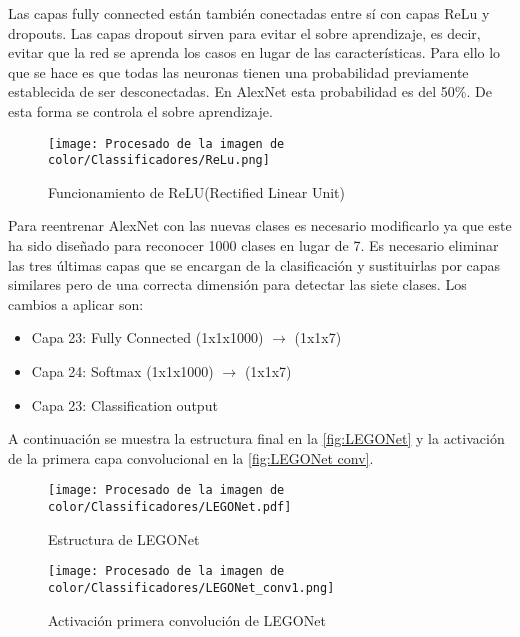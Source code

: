 Las capas fully connected están también conectadas entre sí con capas ReLu y dropouts. Las capas dropout sirven para evitar el sobre aprendizaje, es decir, evitar que la red se aprenda los casos en lugar de las características. Para ello lo que se hace es que todas las neuronas tienen una probabilidad previamente establecida de ser desconectadas. En AlexNet esta probabilidad es del 50\%. De esta forma se controla el sobre aprendizaje.


\begin{figure}[ht]  %
	\centering
	\texttt{[image: Procesado de la imagen de color/Classificadores/ReLu.png]}
	\caption{Funcionamiento de ReLU(Rectified Linear Unit)}
	\label{fig:ReLu}
	\vspace{-5pt}
\end{figure}


Para reentrenar AlexNet con las nuevas clases es necesario modificarlo ya que este ha sido diseñado para reconocer 1000 clases en lugar de 7. Es necesario eliminar las tres últimas capas que se encargan de la clasificación y sustituirlas por capas similares pero de una correcta dimensión para detectar las siete clases. Los cambios a aplicar son:
\begin{itemize}
\item Capa 23: Fully Connected (1x1x1000) $\rightarrow$ (1x1x7)
\item Capa 24: Softmax (1x1x1000) $\rightarrow$ (1x1x7)
\item Capa 23: Classification output
\end{itemize}

A continuación se muestra la estructura final en la \autoref{fig:LEGONet} y la activación de la primera capa convolucional en la \autoref{fig:LEGONet conv}.
	
\begin{figure}[ht]  %
	\centering
	\texttt{[image: Procesado de la imagen de color/Classificadores/LEGONet.pdf]}
	\caption{Estructura de LEGONet}
	\label{fig:LEGONet}
	\vspace{-5pt}
\end{figure}

\begin{figure}[ht]  %
	\centering
	\texttt{[image: Procesado de la imagen de color/Classificadores/LEGONet\_conv1.png]}
	\caption{Activación primera convolución de LEGONet}
	\label{fig:LEGONet conv}
	\vspace{-5pt}
\end{figure}

